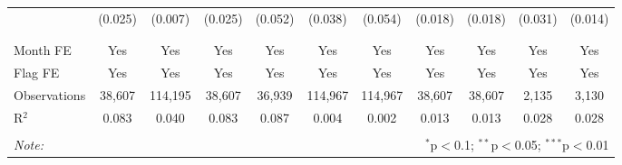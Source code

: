 \begin{table}[!htbp]
\begin{tabular}{@{\extracolsep{1pt}}lcccccccccc}
  & (0.025) & (0.007) & (0.025) & (0.052) & (0.038) & (0.054) & (0.018) & (0.018) & (0.031) & (0.014) \\ 
  & & & & & & & & & & \\ 
\hline \\[-1.8ex] 
Month FE & Yes & Yes & Yes & Yes & Yes & Yes & Yes & Yes & Yes & Yes \\ 
Flag FE & Yes & Yes & Yes & Yes & Yes & Yes & Yes & Yes & Yes & Yes \\ 
Observations & 38,607 & 114,195 & 38,607 & 36,939 & 114,967 & 114,967 & 38,607 & 38,607 & 2,135 & 3,130 \\ 
R$^{2}$ & 0.083 & 0.040 & 0.083 & 0.087 & 0.004 & 0.002 & 0.013 & 0.013 & 0.028 & 0.028 \\ 
\hline 
\hline \\[-1.8ex] 
\textit{Note:}  & \multicolumn{10}{r}{$^{*}$p$<$0.1; $^{**}$p$<$0.05; $^{***}$p$<$0.01} \\ 
\end{tabular} 
\end{table} 
